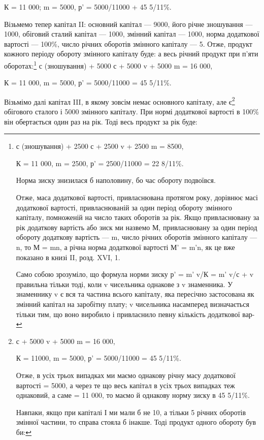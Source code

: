  К = 11 000; m = 5000, р' = 5000/11000 + 45 5/11\%.

Візьмемо тепер капітал II: основний капітал — 9000, його річне
зношування — 1000, обіговий сталий капітал — 1000, змінний
капітал — 1000, норма додаткової вартості — 100\%, число річних
оборотів змінного капіталу — 5. Отже, продукт кожного періоду
обороту змінного капіталу буде:
а весь річний продукт при п’яти оборотах:\footnote{
с (зношування) + 2500 с + 2500 v + 2500 m = 8500,

К = 11 000, m = 2500, р' = 2500/11000 = 22 8/11\%.

Норма зиску знизилася б наполовину, бо час обороту подвоївся.

Отже, маса додаткової вартості, привласнювана протягом року,
дорівнює масі додаткової вартості, привласнюваній за один період
обороту змінного капіталу, помноженій на число таких оборотів
за рік. Якщо привласнювану за рік додаткову вартість або зиск
ми назвемо М, привласнювану за один період обороту додаткову
вартість — m, число річних оборотів змінного капіталу — n, то
М = mn, а річна норма додаткової вартості М' = m'n, як це
вже показано в книзі II, розд. XVI, 1.

Само собою зрозуміло, що формула норми зиску р' = m' v/К =
m' v/с + v правильна тільки тоді, коли v чисельника однакове
з v знаменника. У знаменнику v є вся та частина всього капіталу,
яка пересічно застосована як змінний капітал на заробітну
плату; v чисельника насамперед визначається тільки тим, що
воно виробило і привласнило певну кількість додаткової вар-
} с (зношування) + 5000 с + 5000 v + 5000 m = 16 000,

К = 11 000, m = 5000, р' = 5000/11000 = 45 5/11\%.

Візьмімо далі капітал III, в якому зовсім немає основного капіталу,
але є\footnote{
с + 5000 v + 5000 m = 16 000,

К = 11000, m = 5000, р' = 5000/11000 = 45 5/11\%.

Отже, в усіх трьох випадках ми маємо однакову річну масу
додаткової вартості = 5000, а через те що весь капітал в усіх
трьох випадках теж однаковий, а саме = 11 000, то маємо
й однакову норму зиску в 45 5/11\%.

Навпаки, якщо при капіталі І ми мали б не 10, а тільки
5 річних оборотів змінної частини, то справа стояла б інакше.
Тоді продукт одного обороту був би:
} обігового сталого і 5000 змінного капіталу.
При нормі додаткової вартості в 100\% він обертається один раз
на рік. Тоді весь продукт за рік буде:

